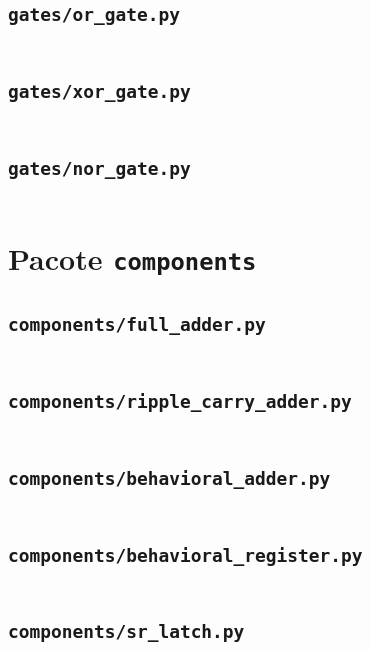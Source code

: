\subsection*{\texttt{gates/or\_gate.py}}
\inputminted{python}{../gates/or_gate.py}

\subsection*{\texttt{gates/xor\_gate.py}}
\inputminted{python}{../gates/xor_gate.py}

\subsection*{\texttt{gates/nor\_gate.py}}
\inputminted{python}{../gates/nor_gate.py}

\section{Pacote \texttt{components}}

\subsection*{\texttt{components/full\_adder.py}}
\inputminted{python}{../components/full_adder.py}

\subsection*{\texttt{components/ripple\_carry\_adder.py}}
\inputminted{python}{../components/ripple_carry_adder.py}

\subsection*{\texttt{components/behavioral\_adder.py}}
\inputminted{python}{../components/behavioral_adder.py}

\subsection*{\texttt{components/behavioral\_register.py}}
\inputminted{python}{../components/behavioral_register.py}

\subsection*{\texttt{components/sr\_latch.py}}
\inputminted{python}{../components/sr_latch.py}

